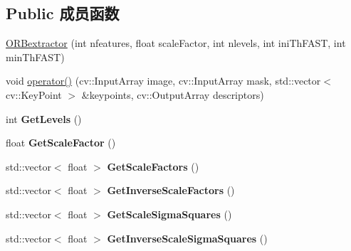 \subsection*{Public 成员函数}
\begin{DoxyCompactItemize}
\item 
\hyperlink{classORB__SLAM2_1_1ORBextractor_aaa8e010415e516246e171b9bbb9f84af}{O\-R\-Bextractor} (int nfeatures, float scale\-Factor, int nlevels, int ini\-Th\-F\-A\-S\-T, int min\-Th\-F\-A\-S\-T)
\item 
void \hyperlink{classORB__SLAM2_1_1ORBextractor_a05117a839e4261638b0413fff2dc9e1b}{operator()} (cv\-::\-Input\-Array image, cv\-::\-Input\-Array mask, std\-::vector$<$ cv\-::\-Key\-Point $>$ \&keypoints, cv\-::\-Output\-Array descriptors)
\item 
\hypertarget{classORB__SLAM2_1_1ORBextractor_abaad86a9c65eed8a2f8af9604b1a53ee}{int {\bfseries Get\-Levels} ()}\label{classORB__SLAM2_1_1ORBextractor_abaad86a9c65eed8a2f8af9604b1a53ee}

\item 
\hypertarget{classORB__SLAM2_1_1ORBextractor_a3352294ae4ae250a406140d2ae6f7286}{float {\bfseries Get\-Scale\-Factor} ()}\label{classORB__SLAM2_1_1ORBextractor_a3352294ae4ae250a406140d2ae6f7286}

\item 
\hypertarget{classORB__SLAM2_1_1ORBextractor_a977d96ed602e3a6ff036afc2f2f213fd}{std\-::vector$<$ float $>$ {\bfseries Get\-Scale\-Factors} ()}\label{classORB__SLAM2_1_1ORBextractor_a977d96ed602e3a6ff036afc2f2f213fd}

\item 
\hypertarget{classORB__SLAM2_1_1ORBextractor_aa56b36e338372ec7cba3945c9194da4a}{std\-::vector$<$ float $>$ {\bfseries Get\-Inverse\-Scale\-Factors} ()}\label{classORB__SLAM2_1_1ORBextractor_aa56b36e338372ec7cba3945c9194da4a}

\item 
\hypertarget{classORB__SLAM2_1_1ORBextractor_a8f574b3b1314c5aa645135cb2f3dca3c}{std\-::vector$<$ float $>$ {\bfseries Get\-Scale\-Sigma\-Squares} ()}\label{classORB__SLAM2_1_1ORBextractor_a8f574b3b1314c5aa645135cb2f3dca3c}

\item 
\hypertarget{classORB__SLAM2_1_1ORBextractor_a1ddabdd67709d7df17000cc2966c47c7}{std\-::vector$<$ float $>$ {\bfseries Get\-Inverse\-Scale\-Sigma\-Squares} ()}\label{classORB__SLAM2_1_1ORBextractor_a1ddabdd67709d7df17000cc2966c47c7}

\end{DoxyCompactItemize}
